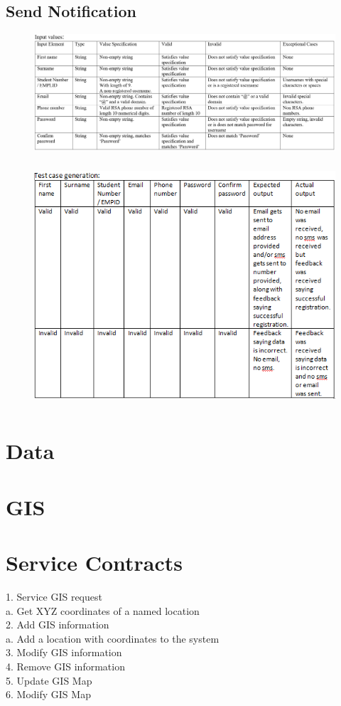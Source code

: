 \documentclass[english]{article}
\begin{document}
\subsection{Send Notification}
\begin{figure}[H]
    \label{tab:example}
\hspace*{-2.5cm}
\includegraphics[width=180mm]{5.png}
\end{figure}

\begin{figure}[H]
\hspace*{-2.5cm}
\includegraphics[width=180mm,height=90mm]{NotificationsTest.png}
\end{figure}

\section{Data}
\section{GIS}
\section{Service Contracts}
1.	Service GIS request\\
	a.	Get XYZ coordinates of a named location\\
2.	Add GIS information\\
	a.	Add a location with coordinates to the system\\
3.	Modify GIS information\\
4.	Remove GIS information\\
5.	Update GIS Map\\
6.	Modify GIS Map\\
\end{document}
